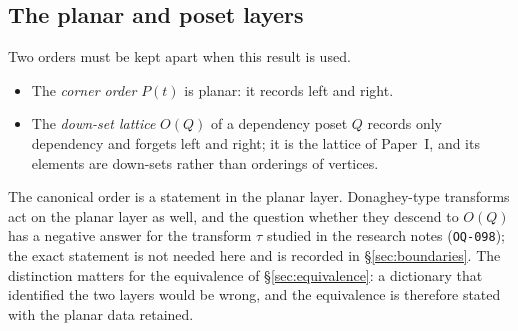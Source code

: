 \subsection{The planar and poset layers}

Two orders must be kept apart when this result is used.

\begin{itemize}
\item The \emph{corner order} $P(t)$ is planar: it records left and right.
\item The \emph{down-set lattice} $O(Q)$ of a dependency poset $Q$ records only
  dependency and forgets left and right; it is the lattice of Paper~I, and its
  elements are down-sets rather than orderings of vertices.
\end{itemize}

The canonical order is a statement in the planar layer.  Donaghey-type transforms act
on the planar layer as well, and the question whether they descend to $O(Q)$ has a
negative answer for the transform $\tau$ studied in the research notes
(\texttt{OQ-098}); the exact statement is not needed here and is recorded in
\S\ref{sec:boundaries}.  The distinction matters for the equivalence of
\S\ref{sec:equivalence}: a dictionary that identified the two layers would be wrong,
and the equivalence is therefore stated with the planar data retained.
